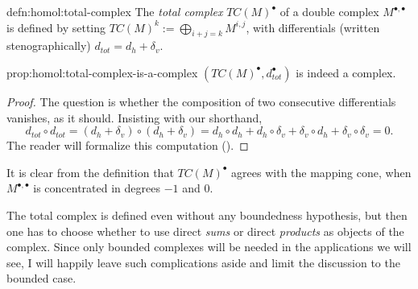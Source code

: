 \begin{defn}{}{defn:homol:total-complex}
  The \emph{total complex} $TC(M)^\bullet$ of a double complex
  $M^{\bullet,\bullet}$ is defined by setting
  $TC(M)^k := \bigoplus_{i+j=k} M^{i,j}$, with differentials (written
  stenographically) $d_{tot} = d_h + \delta_v$.
\end{defn}

\begin{prop}{}{prop:homol:total-complex-is-a-complex}
  $(TC(M)^\bullet, d_{tot}^\bullet)$ is indeed a complex.
\end{prop}
\begin{proof}
  The question is whether the composition of two consecutive
  differentials vanishes, as it should. Insisting with our shorthand,
  \[
    d_{tot} \circ d_{tot} = (d_h + \delta_v) \circ (d_h + \delta_v) =
    d_h \circ d_h + d_h \circ \delta_v + \delta_v \circ d_h + \delta_v
    \circ \delta_v = 0.
  \]
  The reader will formalize this computation
  ().
\end{proof}

It is clear from the definition that $TC(M)^\bullet$ agrees with the
mapping cone, when $M^{\bullet,\bullet}$ is concentrated in degrees
$-1$ and $0$.

The total complex is defined even without any boundedness hypothesis,
but then one has to choose whether to use direct \emph{sums} or direct
\emph{products} as objects of the complex.  Since only bounded
complexes will be needed in the applications we will see, I will
happily leave such complications aside and limit the discussion to the
bounded case.

